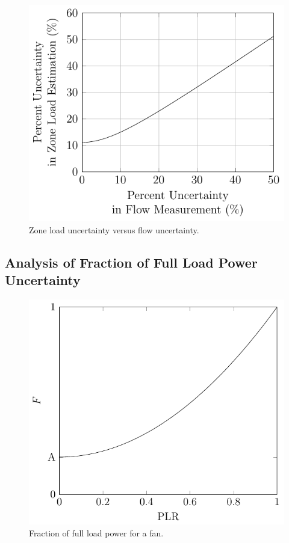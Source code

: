 \begin{figure}
\centering
\includegraphics[]{Plots/2017-05-16-ZoneLoadUncertaintyVsFlowUncertainty.pdf}
\caption{Zone load uncertainty versus flow uncertainty.}
\label{fig:ZoneLoadUncVsFlowUnc}
\end{figure}






\subsection{Analysis of Fraction of Full Load Power Uncertainty}
\begin{figure}
\centering
\includegraphics[]{Plots/2017-05-12-Fcurve.pdf}
\caption{Fraction of full load power for a fan.}
\label{fig:FCurve}
\end{figure}

